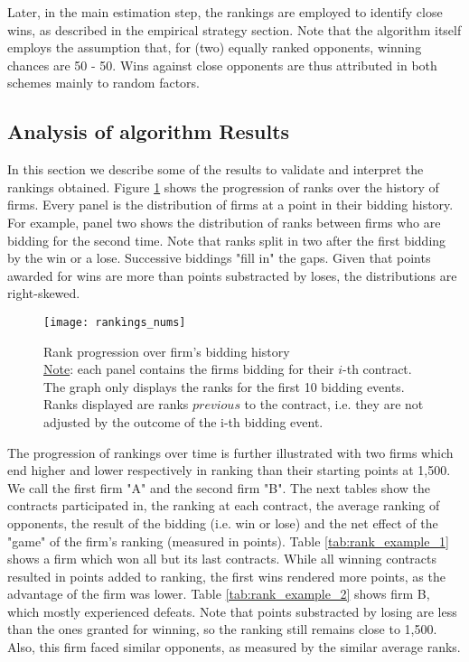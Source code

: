 Later, in the main estimation step, the rankings are employed to identify close wins, as described in the empirical strategy section. Note that the algorithm itself employs the assumption that, for (two) equally ranked opponents, winning chances are 50 - 50. Wins against close opponents are thus attributed in both schemes mainly to random factors.

\subsection{Analysis of algorithm Results}
In this section we describe some of the results to validate and interpret the rankings obtained. Figure \ref{fig:rankings_nums} shows the progression of ranks over the history of firms. Every panel is the distribution of firms at a point in their bidding history. For example, panel two shows the distribution of ranks between firms who are bidding for the second time. Note that ranks split in two after the first bidding by the win or a lose. Successive biddings "fill in" the gaps. Given that points awarded for wins are more than points substracted by loses, the distributions are right-skewed.

\begin{figure}[H]
\centering
  \texttt{[image: rankings\_nums]}
  \caption{Rank progression over firm's bidding history \\ \footnotesize \underline{Note}: each panel contains the firms bidding for their $i$-th contract. The graph only displays the ranks for the first 10 bidding events. Ranks displayed are ranks $previous$ to the contract, i.e. they are not adjusted by the outcome of the i-th bidding event.}
  \label{fig:rankings_nums}
\end{figure}

The progression of rankings over time is further illustrated with two firms which end higher and lower respectively in ranking than their starting points at 1,500. We call the first firm "A" and the second firm "B".  The next tables show the contracts participated in, the ranking at each contract, the average ranking of opponents, the result of the bidding (i.e. win or lose) and the net effect of the "game" of the firm's ranking (measured in points). Table \ref{tab:rank_example_1} shows a firm which won all but its last contracts. While all winning contracts resulted in points added to ranking, the first wins rendered more points, as the advantage of the firm was lower. Table \ref{tab:rank_example_2} shows firm B, which mostly experienced defeats. Note that points substracted by losing are less than the ones granted for winning, so the ranking still remains close to 1,500. Also, this firm faced similar opponents, as measured by the similar average ranks.




